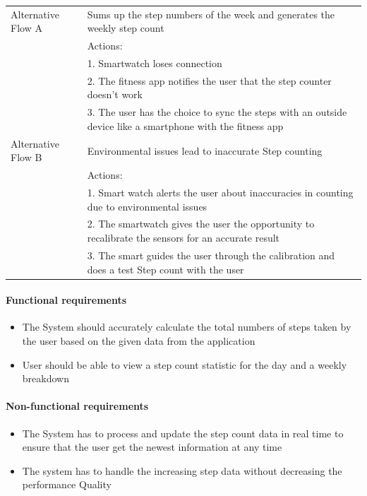 \documentclass{article}
\begin{document}
\begin{table}[h]
\begin{tabularx}{\textwidth}{|>{\raggedright\arraybackslash}p{}|X|}
				Alternative Flow A & Sums up the step numbers of the week and generates the weekly step count \\
								 & Actions: \\
								 & 1. Smartwatch loses connection \\
								 & 2. The fitness app notifies the user that the step counter doesn't work \\
								 & 3. The user has the choice to sync the steps with an outside device like a smartphone with the fitness app\\ \hline
				Alternative Flow B & Environmental issues lead to inaccurate Step counting \\
								 & Actions: \\
								 & 1. Smart watch alerts the user about inaccuracies in counting due to environmental issues \\
								 & 2. The smartwatch gives the user the opportunity to recalibrate the sensors for an accurate result \\
								 & 3. The smart guides the user through the calibration and does a test Step count with the user \\ \hline
			\end{tabularx}
		\end{table}
		\paragraph{Functional requirements}
		\begin{itemize}
			\item The System should accurately calculate the total numbers of steps taken by the user based on the given data from the application
			\item User should be able to view a step count statistic for the day and a weekly breakdown		
		\end{itemize}
		
		\paragraph{Non-functional requirements}
		\begin{itemize}
			\item The System has to process and update the step count data in real time to ensure that the user get the newest information at any time
			\item The system has to handle the increasing step data without decreasing the
performance Quality
		\end{itemize}
\end{document}
